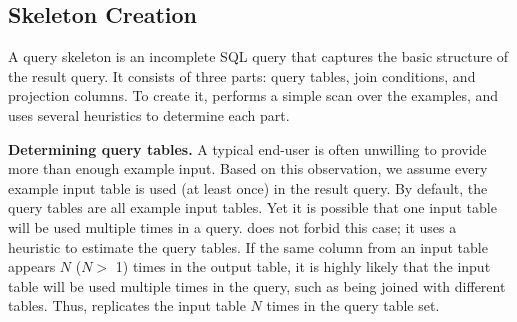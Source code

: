 \subsection{Skeleton Creation}
\label{sec:skeleton}



A query skeleton is an incomplete SQL query
that captures the basic structure of the result query.
It consists of three parts: query tables,
join conditions, and projection columns.
To create it, \ourtool performs a simple scan over
the examples, and uses several heuristics to determine
each part.



\vspace{1mm}
{\textbf{Determining query tables.}} 
A typical end-user is often unwilling to provide more than enough
example input. Based on this observation, we assume every example input table
is used (at least once) in the result query.
By default, the query tables are all example input tables.
Yet it is possible that one input table will be
used multiple times in a query. \ourtool does not forbid this case;
it uses a heuristic to estimate the query tables.
If the same column from an input table appears $N$ ($N >$ 1) times in the
output table, it is highly likely that the input table
will be used multiple times in the query, such
as being joined with different tables.
Thus, \ourtool replicates the input table $N$ times in
the query table set.




